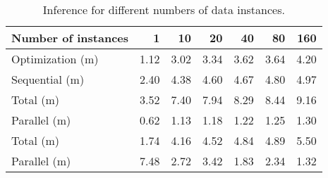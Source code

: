\begin{table*}
  \centering
  \caption{Inference for different numbers of data instances.}
  \ttfamily
  \begin{tabular}{lrrrrrr}
    \toprule
    \textnormal{Number of instances} &    1 &   10 &   20 &   40 &   80 &  160 \\
    \midrule
    \textnormal{Optimization (m)}    & 1.12 & 3.02 & 3.34 & 3.62 & 3.64 & 4.20 \\
    \midrule
    \textnormal{Sequential (m)}      & 2.40 & 4.38 & 4.60 & 4.67 & 4.80 & 4.97 \\
    \textnormal{Total (m)}           & 3.52 & 7.40 & 7.94 & 8.29 & 8.44 & 9.16 \\
    \midrule
    \textnormal{Parallel (m)}        & 0.62 & 1.13 & 1.18 & 1.22 & 1.25 & 1.30 \\
    \textnormal{Total (m)}           & 1.74 & 4.16 & 4.52 & 4.84 & 4.89 & 5.50 \\
    \midrule
    \textnormal{Parallel (m)}        & 7.48 & 2.72 & 3.42 & 1.83 & 2.34 & 1.32 \\
    \bottomrule
  \end{tabular}
\end{table*}
